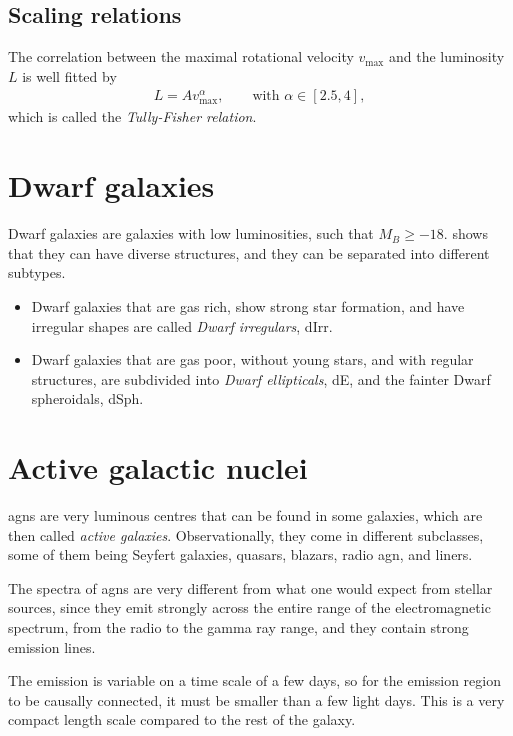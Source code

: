 \subsection{Scaling relations}
The correlation between the maximal rotational velocity $v_\text{max}$ and the luminosity $L$ is well fitted by
\begin{align*}
	L = A v_\text{max}^\alpha, 
	\qquad \text{with } \alpha \in [2.5, 4],
\end{align*}
which is called the \emph{Tully-Fisher relation}.




\section{Dwarf galaxies}
Dwarf galaxies are galaxies with low luminosities, such that $M_B \geq - 18$.
 shows that they can have diverse structures, and they can be separated into different subtypes.
\begin{itemize}
	\item Dwarf galaxies that are gas rich, show strong star formation, and have irregular shapes are called \emph{Dwarf irregulars}, dIrr.
	\item Dwarf galaxies that are gas poor, without young stars, and with regular structures, are subdivided into \emph{Dwarf ellipticals}, dE, and the fainter Dwarf spheroidals, dSph.
\end{itemize}


\section{Active galactic nuclei}
\Acp{agn} are very luminous centres that can be found in some galaxies, which are then called \emph{active galaxies}.
Observationally, they come in different subclasses, some of them being Seyfert galaxies, quasars, blazars, radio \ac{agn}, and liners.

The spectra of \acp{agn} are very different from what one would expect from stellar sources, since they emit strongly across the entire range of the electromagnetic spectrum, from the radio to the gamma ray range, and they contain strong emission lines.

The emission is variable on a time scale of a few days, so for the emission region to be causally connected, it must be smaller than a few light days.
This is a very compact length scale compared to the rest of the galaxy.


